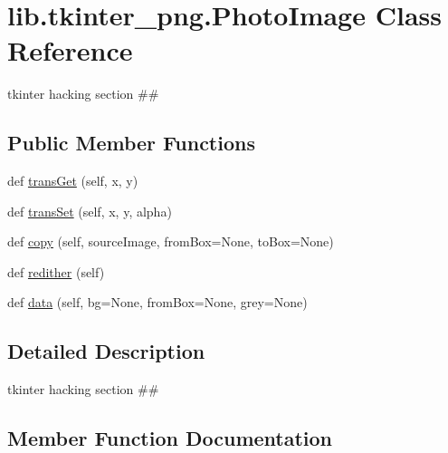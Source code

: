 \hypertarget{classlib_1_1tkinter__png_1_1_photo_image}{}\section{lib.\+tkinter\+\_\+png.\+Photo\+Image Class Reference}
\label{classlib_1_1tkinter__png_1_1_photo_image}


tkinter hacking section \#\#  


\subsection*{Public Member Functions}
\begin{DoxyCompactItemize}
\item 
def \hyperlink{classlib_1_1tkinter__png_1_1_photo_image_a574fff7e67399fbdff7cbfa37f6cd4ca}{trans\+Get} (self, x, y)
\item 
def \hyperlink{classlib_1_1tkinter__png_1_1_photo_image_a9ca555414a7d560550434fd1f613922d}{trans\+Set} (self, x, y, alpha)
\item 
def \hyperlink{classlib_1_1tkinter__png_1_1_photo_image_a8f1a40efe35581a0037f6cc2d270cc15}{copy} (self, source\+Image, from\+Box=None, to\+Box=None)
\item 
def \hyperlink{classlib_1_1tkinter__png_1_1_photo_image_a34f1f41b8e463218780f7eb4bcb7c4a9}{redither} (self)
\item 
def \hyperlink{classlib_1_1tkinter__png_1_1_photo_image_a6530df43984a11c68cb2f6de19a3d29e}{data} (self, bg=None, from\+Box=None, grey=None)
\end{DoxyCompactItemize}


\subsection{Detailed Description}
tkinter hacking section \#\# 

\subsection{Member Function Documentation}
\mbox{\label{classlib_1_1tkinter__png_1_1_photo_image_a8f1a40efe35581a0037f6cc2d270cc15}} 
